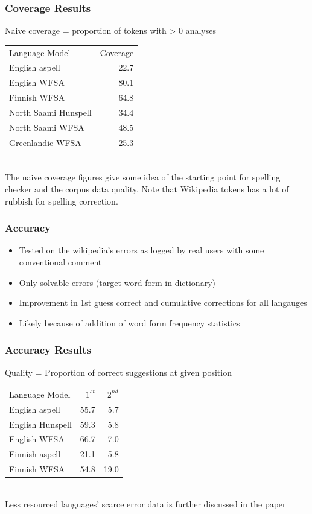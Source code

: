 \documentclass[t,12pt]{beamer}
\begin{document}
\begin{frame}
    \frametitle{Coverage Results}
    Naive coverage = proportion of tokens with > 0 analyses\\
    \begin{tabular}{l|r}
        Language Model & Coverage \\
        English aspell & 22.7 \\
        English WFSA & 80.1 \\
        Finnish WFSA & 64.8 \\
        North Saami Hunspell & 34.4 \\
        North Saami WFSA & 48.5 \\
        Greenlandic WFSA & 25.3 \\
    \end{tabular}\\
    The naive coverage figures give some idea of the starting point for
    spelling checker and the corpus data quality. Note that Wikipedia tokens
    has a lot of rubbish for spelling correction.
\end{frame}

\begin{frame}
    \frametitle{Accuracy}
    \begin{itemize}
        \item Tested on the wikipedia's errors as logged by real users with
            some conventional comment
        \item Only solvable errors (target word-form in dictionary)
        \item Improvement in 1st guess correct and cumulative corrections
            for all langauges
        \item Likely because of addition of word form frequency statistics
    \end{itemize}
\end{frame}

\begin{frame}
    \frametitle{Accuracy Results}
    Quality = Proportion of correct suggestions at given position\\
    \begin{tabular}{l|rr}
        Language Model & $1^{st}$ & $2^{nd}$ \\
        English aspell &55.7 & 5.7 \\
        English Hunspell &59.3 & 5.8 \\
        English WFSA &66.7 & 7.0 \\
 \hline 
 Finnish aspell & 21.1 & 5.8 \\ 
 Finnish WFSA  & 54.8 & 19.0 \\
\end{tabular}\\
Less resourced languages' scarce error data is further discussed in the paper
\end{frame}
\end{document}
